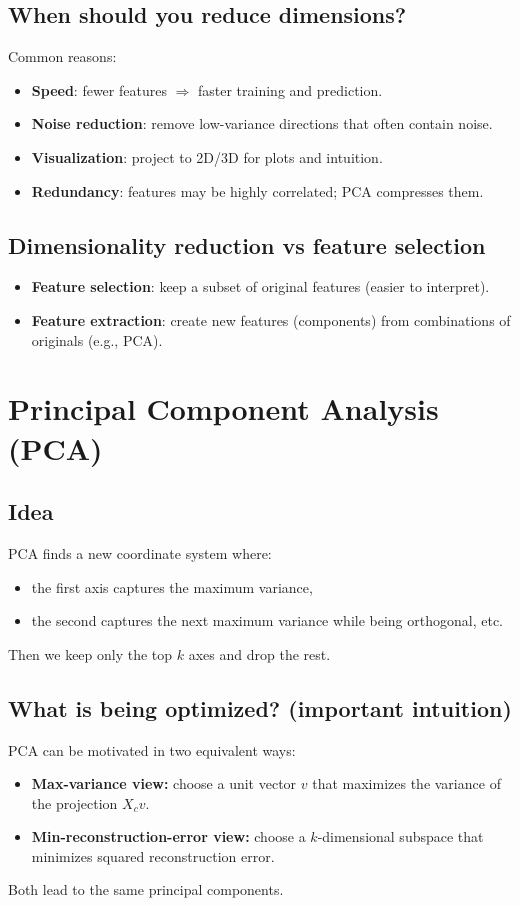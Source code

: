 \documentclass[11pt]{article}
\begin{document}
\subsection{When should you reduce dimensions?}
Common reasons:
\begin{itemize}[leftmargin=*]
  \item \textbf{Speed}: fewer features $\Rightarrow$ faster training and prediction.
  \item \textbf{Noise reduction}: remove low-variance directions that often contain noise.
  \item \textbf{Visualization}: project to 2D/3D for plots and intuition.
  \item \textbf{Redundancy}: features may be highly correlated; PCA compresses them.
\end{itemize}

\subsection{Dimensionality reduction vs feature selection}
\begin{itemize}[leftmargin=*]
  \item \textbf{Feature selection}: keep a subset of original features (easier to interpret).
  \item \textbf{Feature extraction}: create new features (components) from combinations of originals (e.g., PCA).
\end{itemize}

\section{Principal Component Analysis (PCA)}
\subsection{Idea}
PCA finds a new coordinate system where:
\begin{itemize}[leftmargin=*]
  \item the first axis captures the maximum variance,
  \item the second captures the next maximum variance while being orthogonal, etc.
\end{itemize}
Then we keep only the top $k$ axes and drop the rest.

\subsection{What is being optimized? (important intuition)}
PCA can be motivated in two equivalent ways:
\begin{itemize}[leftmargin=*]
  \item \textbf{Max-variance view:} choose a unit vector $v$ that maximizes the variance of the projection $X_c v$.
  \item \textbf{Min-reconstruction-error view:} choose a $k$-dimensional subspace that minimizes squared reconstruction error.
\end{itemize}
Both lead to the same principal components.
\end{document}
